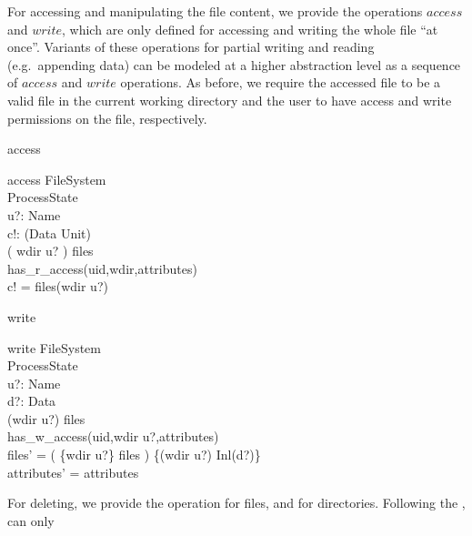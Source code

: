 For accessing and manipulating the file content, we provide the operations
$access$ and $write$, which are only defined for accessing and writing the whole
file ``at once''.  Variants of these operations for partial writing and reading
(e.g.\ appending data) can be modeled at a higher abstraction level as a
sequence of $access$ and $write$ operations.  As before, we require the accessed
file to be a valid file in the current working directory and the user to have
access and write permissions on the file, respectively.
\begin{doc}{access}
  \begin{schema}{access}
    \Xi FileSystem \\
    \Xi ProcessState \\
    u?: Name \\
    c!: (Data \pplus Unit) \\
    \where
    ( wdir \cat \langle u? \rangle ) \isfilein files \\
    
    has\_r\_access(uid,wdir,attributes) \\
    c! = files(wdir \cat\langle u?\rangle)
  \end{schema}
\end{doc}
\begin{doc}{write}
  \begin{schema}{write}
    \Delta FileSystem \\
    \Xi ProcessState \\
    u?: Name \\
    d?: Data \\
    \where
    (wdir \cat \langle u?\rangle) \isfilein files\\ 
    has\_w\_access(uid,wdir \cat \langle u?\rangle,attributes)\\

    files' = ( \{wdir \cat \langle u?\rangle\} \ndres files ) \oplus \{(wdir
    \cat \langle u?\rangle) \mapsto Inl(d?)\} \\ 
    attributes' = attributes \\
  \end{schema}
\end{doc}
\enlargethispage{3\baselineskip}
For deleting, we provide the operation  for files, and
 for directories. Following the \susv{},  can only
